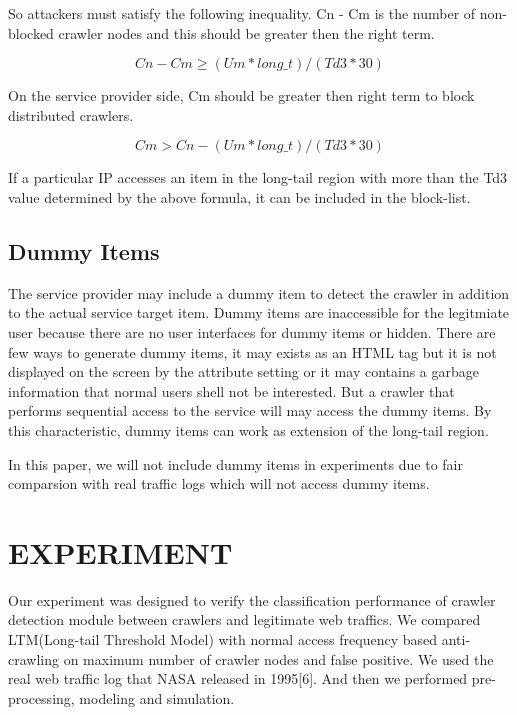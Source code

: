 \documentclass[sigconf,anonymous=true]{acmart}
\begin{document}
So attackers must satisfy the following inequality. Cn - Cm is the number of non-blocked crawler nodes and this should be greater then the right term.

  \begin{displaymath}
Cn - Cm \geq (Um * long\_t) / (Td3 * 30)
  \end{displaymath}

On the service provider side, Cm should be greater then right term to block distributed crawlers.

  \begin{displaymath}
Cm > Cn - (Um * long\_t) / (Td3 * 30)
  \end{displaymath}

If a particular IP accesses an item in the long-tail region with more than the Td3 value determined by the above formula, it can be included in the block-list.


\subsection{Dummy Items}
The service provider may include a dummy item to detect the crawler in addition to the actual service target item. Dummy items are inaccessible for the legitmiate user because there are no user interfaces for dummy items or hidden. There are few ways to generate dummy items, it may exists as an HTML tag but it is not displayed on the screen by the attribute setting or it may contains a garbage information that normal users shell not be interested. But a crawler that performs sequential access to the service will may access the dummy items. By this characteristic, dummy items can work as extension of the long-tail region.

In this paper, we will not include dummy items in experiments due to fair comparsion with real traffic logs which will not access dummy items.



%
%
\section{EXPERIMENT}
Our experiment was designed to verify the classification performance of crawler detection module between crawlers and legitimate  web traffics. We compared LTM(Long-tail Threshold Model) with normal access frequency based anti-crawling on maximum number of crawler nodes and false positive.
We used the real web traffic log that NASA released in 1995[6]. And then we performed pre-processing, modeling and simulation.
\end{document}
